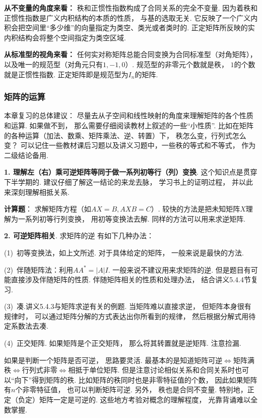 \textbf{从不变量的角度来看：}
秩和正惯性指数构成了合同关系的完全不变量.
因为着秩和正惯性指数是广义内积结构的本质的性质，
与基的选取无关.
它反映了一个广义内积会把空间里“多少维”的向量指定为类空、类光或者类时的.
正定矩阵所反映的实内积结构会将整个空间指定为类空区域.

\textbf{从标准型的视角来看：}
任何实对称矩阵总能合同变换为合同标准型（对角矩阵），
以及唯一的规范型（对角元只有$1,-1,0$）.
规范型的非零元个数就是秩，
$1$的个数就是正惯性指数.
正定矩阵即是规范型为$I_n$的矩阵.


\subsubsection{矩阵的运算}

本章复习的总体建议：
尽量去从子空间和线性映射的角度来理解矩阵的各个性质和运算.
如果做不到，
那么需要仔细阅读教材上叙述的一些“小性质”.
比如在矩阵的各种运算（加法、数乘、矩阵乘法、逆、转置）下，
秩怎么变，行列式怎么变？
可以记住一些教材课后习题以及讲义习题中，一些秩的等式和不等式，
作为二级结论备用.

\medskip

\textbf{1. 理解左（右）乘可逆矩阵等同于做一系列初等行（列）变换}.
这个知识点是贯穿下半学期的.
建议仔细了解这一结论的来龙去脉，
学习书上的证明过程，
并以此来深刻理解相抵关系.

\textbf{计算题}：
求解矩阵方程（如$AX=B, AXB = C$）.
较快的方法是把未知矩阵$X$理解为一系列初等行列变换，
用初等变换法去解.
同样的方法可以用来求逆矩阵.

\medskip

\textbf{2. 可逆矩阵相关}.
求矩阵的逆
有如下几种办法：

(1)~初等变换法，如上文所述.
对于具体给定的矩阵，
一般来说是最快的方法.

(2)~伴随矩阵法：利用$AA^* = |A|I$.
一般来说不建议用来求矩阵的逆.
但是题目有可能直接涉及伴随矩阵的性质.
伴随矩阵相关的性质和处理办法，
结合讲义5.4.4节复习.

(3)~凑.讲义5.4.3与矩阵求逆有关的例题.
当矩阵难以直接求逆，
但矩阵本身很有规律时，
可以通过矩阵分解的方式表达出你所看到的规律，
然后根据分解式用待定系数法去凑.

(4)~正交矩阵.
如果矩阵是个正交矩阵，
那么将其转置就是逆矩阵.
注意捡漏.

如果是判断一个矩阵是否可逆，
思路要灵活.
最基本的是知道矩阵可逆$\Leftrightarrow$矩阵满秩$\Leftrightarrow$行列式非零$\Leftrightarrow$相抵于单位矩阵.
但是注意讨论相似关系和合同关系时也可以“向下”得到矩阵的秩.
比如矩阵的秩同时也是非零特征值的个数，
因此如果矩阵有$n$个非零特征值，
也可以判断矩阵可逆.
另外，
秩也是合同不变量.
特别地，正定（负定）矩阵一定是可逆的.
这些地方考验对概念的理解程度，
光靠背诵难以全数掌握.

